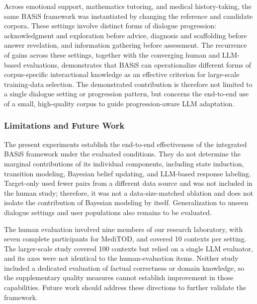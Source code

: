 \documentclass[manuscript,review,anonymous]{acmart}
\begin{document}
Across emotional support, mathematics tutoring, and medical history-taking, the same BASiS framework was instantiated by changing the reference and candidate corpora. These settings involve distinct forms of dialogue progression: acknowledgment and exploration before advice, diagnosis and scaffolding before answer revelation, and information gathering before assessment. The recurrence of gains across these settings, together with the converging human and LLM-based evaluations, demonstrates that BASiS can operationalize different forms of corpus-specific interactional knowledge as an effective criterion for large-scale training-data selection. The demonstrated contribution is therefore not limited to a single dialogue setting or progression pattern, but concerns the end-to-end use of a small, high-quality corpus to guide progression-aware LLM adaptation.

\subsubsection{Limitations and Future Work}

The present experiments establish the end-to-end effectiveness of the integrated BASiS framework under the evaluated conditions. They do not determine the marginal contributions of its individual components, including state induction, transition modeling, Bayesian belief updating, and LLM-based response labeling. Target-only used fewer pairs from a different data source and was not included in the human study; therefore, it was not a data-size-matched ablation and does not isolate the contribution of Bayesian modeling by itself. Generalization to unseen dialogue settings and user populations also remains to be evaluated.

The human evaluation involved nine members of our research laboratory, with seven complete participants for MediTOD, and covered 10 contexts per setting. The larger-scale study covered 100 contexts but relied on a single LLM evaluator, and its axes were not identical to the human-evaluation items. Neither study included a dedicated evaluation of factual correctness or domain knowledge, so the supplementary quality measures cannot establish improvement in those capabilities. Future work should address these directions to further validate the framework.
\end{document}
